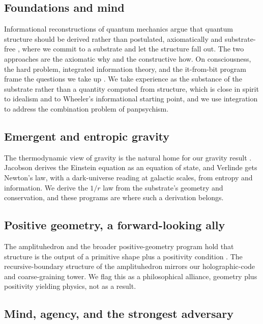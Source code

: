 \subsection{Foundations and mind}

Informational reconstructions of quantum mechanics argue that quantum structure should be derived rather than
postulated, axiomatically and substrate-free \cite{chiribella2011}, where we commit to a substrate and let the
structure fall out. The two approaches are the axiomatic why and the constructive how. On consciousness, the hard
problem, integrated information theory, and the it-from-bit program frame the questions we take up
\cite{chalmers1995, tononi2004, wheeler1990}. We take experience as the substance of the substrate rather than a
quantity computed from structure, which is close in spirit to idealism and to Wheeler's informational starting
point, and we use integration to address the combination problem of panpsychism.

\subsection{Emergent and entropic gravity}

The thermodynamic view of gravity is the natural home for our gravity result \cite{jacobson1995, padmanabhan2010,
verlinde2011, verlinde2017}. Jacobson derives the Einstein equation as an equation of state, and Verlinde gets
Newton's law, with a dark-universe reading at galactic scales, from entropy and information. We derive the $1/r$
law from the substrate's geometry and conservation, and these programs are where such a derivation belongs.

\subsection{Positive geometry, a forward-looking ally}

The amplituhedron and the broader positive-geometry program hold that structure is the output of a primitive shape
plus a positivity condition \cite{arkanihamed2014, arkanihamed2017}. The recursive-boundary structure of the
amplituhedron mirrors our holographic-code and coarse-graining tower. We flag this as a philosophical alliance,
geometry plus positivity yielding physics, not as a result.

\subsection{Mind, agency, and the strongest adversary}

